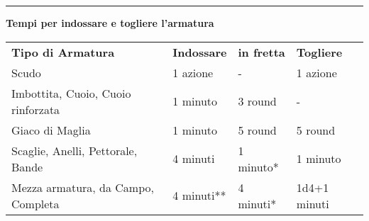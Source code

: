 \documentclass[a4paper,12 pt,openany]{book}
\newcommand{\riga}{\rule{\textwidth}{0.4pt}}
\begin{document}
\begin{textblock*}{15cm}
\riga

\textbf{Tempi per indossare e togliere l'armatura}\\

\begin{tabular}{llll}
\textbf{Tipo di Armatura}& \textbf{Indossare} & \textbf{in fretta} & \textbf{Togliere}\\
Scudo								& 1 azione 	& -     	& 1 azione\\
Imbottita, Cuoio, Cuoio rinforzata  & 1 minuto	& 3 round  	& - \\
Giaco di Maglia						& 1 minuto	& 5 round  & 5 round\\
Scaglie, Anelli, Pettorale, Bande   & 4 minuti 	& 1 minuto{*}  & 1 minuto\\
Mezza armatura, da Campo, Completa  & 4 minuti{*}{*}& 4 minuti{*}& 1d4+1 minuti\\
\end{tabular}

\end{textblock*}
\end{document}

